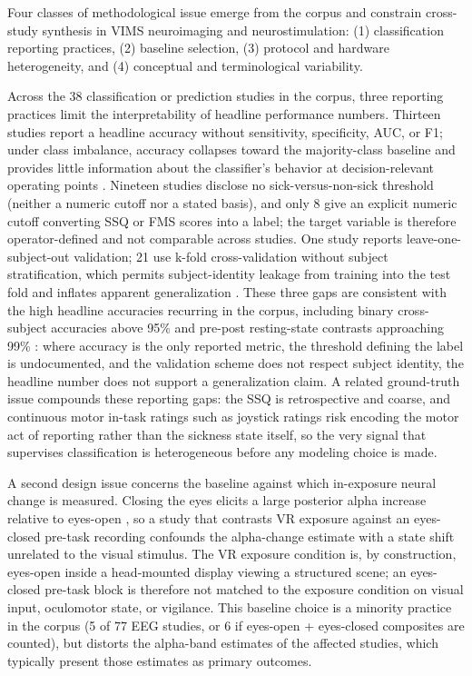 Four classes of methodological issue emerge from the corpus and constrain cross-study synthesis in VIMS neuroimaging and neurostimulation: (1) classification reporting practices, (2) baseline selection, (3) protocol and hardware heterogeneity, and (4) conceptual and terminological variability.

Across the 38 classification or prediction studies in the corpus, three reporting practices limit the interpretability of headline performance numbers.
Thirteen studies report a headline accuracy without sensitivity, specificity, AUC, or F1; under class imbalance, accuracy collapses toward the majority-class baseline and provides little information about the classifier's behavior at decision-relevant operating points \cite{saitoPrecisionRecallPlotMore2015, combrissonExceedingChanceLevel2015}.
Nineteen studies disclose no sick-versus-non-sick threshold (neither a numeric cutoff nor a stated basis), and only 8 give an explicit numeric cutoff converting SSQ or FMS scores into a label; the target variable is therefore operator-defined and not comparable across studies.
One study reports leave-one-subject-out validation; 21 use k-fold cross-validation without subject stratification, which permits subject-identity leakage from training into the test fold and inflates apparent generalization \cite{varoquauxCrossvalidationFailureSmall2018}.
These three gaps are consistent with the high headline accuracies recurring in the corpus, including binary cross-subject accuracies above 95\% \cite{huaDetectionVirtualReality2024, huaEEGClassificationModel2024, huaDualpathwayEEGModel2025, jeongCybersicknessAnalysisEEG2019, zhouApplicationEEGSTransformation2023} and pre-post resting-state contrasts approaching 99\% \cite{chaiEEGStudyVirtual2023}: where accuracy is the only reported metric, the threshold defining the label is undocumented, and the validation scheme does not respect subject identity, the headline number does not support a generalization claim.
A related ground-truth issue compounds these reporting gaps: the SSQ is retrospective and coarse, and continuous motor in-task ratings such as joystick ratings risk encoding the motor act of reporting rather than the sickness state itself, so the very signal that supervises classification is heterogeneous before any modeling choice is made.

A second design issue concerns the baseline against which in-exposure neural change is measured.
Closing the eyes elicits a large posterior alpha increase relative to eyes-open \cite{bergerUeberElektrenkephalogrammMenschen1929, klimeschEEGAlphaOscillations2007, barryEEGDifferencesEyesclosed2007}, so a study that contrasts VR exposure against an eyes-closed pre-task recording confounds the alpha-change estimate with a state shift unrelated to the visual stimulus.
The VR exposure condition is, by construction, eyes-open inside a head-mounted display viewing a structured scene; an eyes-closed pre-task block is therefore not matched to the exposure condition on visual input, oculomotor state, or vigilance.
This baseline choice is a minority practice in the corpus (5 of 77 EEG studies, or 6 if eyes-open + eyes-closed composites are counted), but distorts the alpha-band estimates of the affected studies, which typically present those estimates as primary outcomes.

